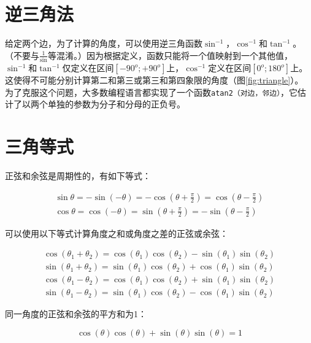 \section{逆三角法}

给定两个边，为了计算的角度，可以使用逆三角函数$\sin^{-1}$，$\cos^{-1}$和$\tan^{-1}$。（不要与$\frac{1}{\sin}$等混淆。）因为根据定义，函数只能将一个值映射到一个其他值，$\sin^{-1}$和$\tan^{-1}$仅定义在区间$[-90^o;+90^o]$上，$\cos^{-1}$定义在区间$[0^o;180^o]$上。这使得不可能分别计算第二和第三或第三和第四象限的角度（图\ref{fig:triangle}）。
为了克服这个问题，大多数编程语言都实现了一个函数\texttt{atan2（对边，邻边）}，它估计了以两个单独的参数为分子和分母的正负号。


\section{三角等式}

正弦和余弦是周期性的，有如下等式：

\begin{eqnarray}
\sin\theta=-\sin(-\theta)=-\cos(\theta+\frac{\pi}{2})=\cos(\theta-\frac{\pi}{2})\\
\cos\theta=\cos(-\theta)=\sin(\theta+\frac{\pi}{2})=-\sin(\theta-\frac{\pi}{2})
\end{eqnarray}


可以使用以下等式计算角度之和或角度之差的正弦或余弦：

\begin{eqnarray}
\cos(\theta_1+\theta_2)=\cos(\theta_1)\cos(\theta_2)-\sin(\theta_1)\sin(\theta_2)\\
\sin(\theta_1+\theta_2)=\sin(\theta_1)\cos(\theta_2)+\cos(\theta_1)\sin(\theta_2)\\
\cos(\theta_1-\theta_2)=\cos(\theta_1)\cos(\theta_2)+\sin(\theta_1)\sin(\theta_2)\\
\sin(\theta_1-\theta_2)=\sin(\theta_1)\cos(\theta_2)-\cos(\theta_1)\sin(\theta_2)
\end{eqnarray}


同一角度的正弦和余弦的平方和为1：

\begin{equation}
\cos(\theta)\cos(\theta)+\sin(\theta)\sin(\theta)=1
\end{equation}